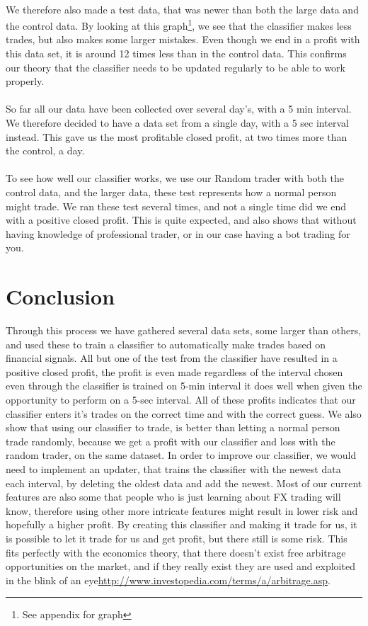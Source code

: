 \documentclass[10pt]{IEEEtran}
\begin{document}
\\
We therefore also made a test data, that was newer than both the large data and the control data. By looking at this graph\footnote{See appendix for graph}, we see that the classifier makes less trades, but also makes some larger mistakes. Even though we end in a profit with this data set, it is around 12 times less than in the control data. This confirms our theory that the classifier needs to be updated regularly to be able to work properly.
\\
\\
So far all our data have been collected over several day's, with a 5 min interval. We therefore decided to have a data set from a single day, with a 5 sec interval instead. This gave us the most profitable closed profit, at two times more than the control, a day.\\
\\
To see how well our classifier works, we use our Random trader with both the control data, and the larger data, these test represents how a normal person might trade. We ran these test several times, and not a single time did we end with a positive closed profit. This is quite expected, and also shows that without having knowledge of professional trader, or in our case having a bot trading for you.

\section{Conclusion}
Through this process we have gathered several data sets, some larger than others, and used these to train a classifier to automatically make trades based on financial signals. All but one of the test from the classifier have resulted in a positive closed profit, the profit is even made regardless of the interval chosen even through the classifier is trained on 5-min interval it does well when given the opportunity to perform on a 5-sec interval. All of these profits indicates that our classifier enters it's  trades on the correct time and with the correct guess. We also show that using our classifier to trade, is better than letting a normal person trade randomly, because we get a profit with our classifier and loss with the random trader, on the same dataset. 
In order to improve our classifier, we would need to implement an updater, that trains the classifier with the newest data each interval, by deleting the oldest data and add the newest. Most of our current features are also some that people who is just learning about FX trading will know, therefore using other more intricate features might result in lower risk and hopefully a higher profit. By creating this classifier and making it trade for us, it is possible to let it trade for us and get profit, but there still is some risk. This fits perfectly with the economics theory, that there doesn't exist free arbitrage opportunities on the market, and if they really exist they are used and exploited in the blink of an eye\url{http://www.investopedia.com/terms/a/arbitrage.asp}.
\end{document}

